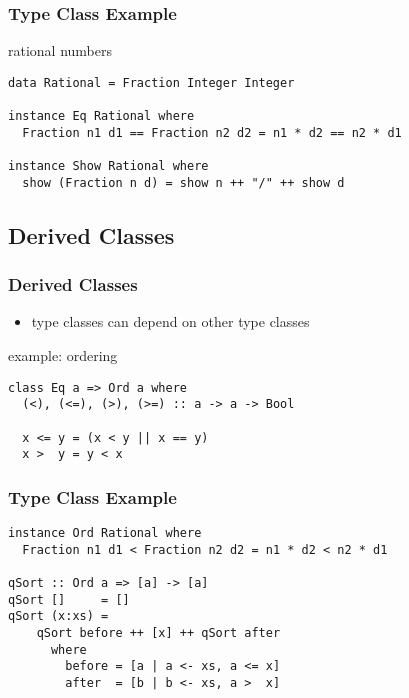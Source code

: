 \documentclass[dvipsnames]{beamer}
\theoremstyle{plain}
\begin{document}
\begin{frame}[fragile]
  \frametitle{Type Class Example}

  \begin{exampleblock}{rational numbers}
    \begin{lstlisting}
data Rational = Fraction Integer Integer

instance Eq Rational where
  Fraction n1 d1 == Fraction n2 d2 = n1 * d2 == n2 * d1

instance Show Rational where
  show (Fraction n d) = show n ++ "/" ++ show d
    \end{lstlisting}
  \end{exampleblock}
\end{frame}

\subsection{Derived Classes}

\begin{frame}[fragile]
  \frametitle{Derived Classes}

  \begin{itemize}
    \item type classes can depend on other type classes
  \end{itemize}

  \begin{exampleblock}{example: ordering}
    \begin{lstlisting}
class Eq a => Ord a where
  (<), (<=), (>), (>=) :: a -> a -> Bool

  x <= y = (x < y || x == y)
  x >  y = y < x
    \end{lstlisting}
  \end{exampleblock}
\end{frame}

\begin{frame}[fragile]
  \frametitle{Type Class Example}

  \begin{lstlisting}
instance Ord Rational where
  Fraction n1 d1 < Fraction n2 d2 = n1 * d2 < n2 * d1

qSort :: Ord a => [a] -> [a]
qSort []     = []
qSort (x:xs) =
    qSort before ++ [x] ++ qSort after
      where
        before = [a | a <- xs, a <= x]
        after  = [b | b <- xs, a >  x]
  \end{lstlisting}
\end{frame}
\end{document}
